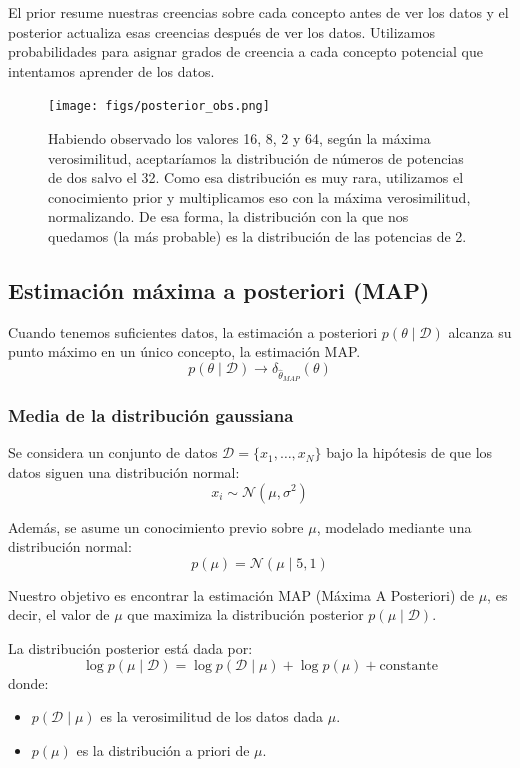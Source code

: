 El prior resume nuestras creencias sobre cada concepto antes de ver los datos y el posterior actualiza esas creencias después de ver los datos. Utilizamos probabilidades para asignar grados de creencia a cada concepto potencial que intentamos aprender de los datos.

\begin{figure}[h]
\centering
\texttt{[image: figs/posterior\_obs.png]}
\caption{Habiendo observado los valores 16, 8, 2 y 64, según la máxima verosimilitud, aceptaríamos la distribución de números de potencias de dos salvo el 32. Como esa distribución es muy rara, utilizamos el conocimiento prior y multiplicamos eso con la máxima verosimilitud, normalizando. De esa forma, la distribución con la que nos quedamos (la más probable) es la distribución de las potencias de 2.}
\end{figure}

\subsection{Estimación máxima a posteriori (MAP)}
Cuando tenemos suficientes datos, la estimación a posteriori $p(\theta \mid \mathcal{D})$ alcanza su punto máximo en un único concepto, la estimación MAP.
$$p(\theta \mid \mathcal{D}) \rightarrow \delta_{\hat{\theta}_{MAP}} (\theta)$$

\subsubsection{Media de la distribución gaussiana}
Se considera un conjunto de datos $\mathcal{D} = \{x_1, \dots, x_N\}$ bajo la hipótesis de que los datos siguen una distribución normal:
$$ x_i \sim \mathcal{N}(\mu, \sigma^2)$$

Además, se asume un conocimiento previo sobre $\mu$, modelado mediante una distribución normal:
$$p(\mu) = \mathcal{N}(\mu \mid 5, 1)$$

Nuestro objetivo es encontrar la estimación MAP (Máxima A Posteriori) de $\mu$, es decir, el valor de $\mu$ que maximiza la distribución posterior $p(\mu \mid \mathcal{D})$.

La distribución posterior está dada por:
$$ \log p(\mu \mid \mathcal{D}) = \log p(\mathcal{D} \mid \mu) + \log p(\mu) + \text{constante}$$
donde:
\begin{itemize}
\item $p(\mathcal{D} \mid \mu)$ es la verosimilitud de los datos dada $\mu$.
\item $p(\mu)$ es la distribución a priori de $\mu$.
\end{itemize}

